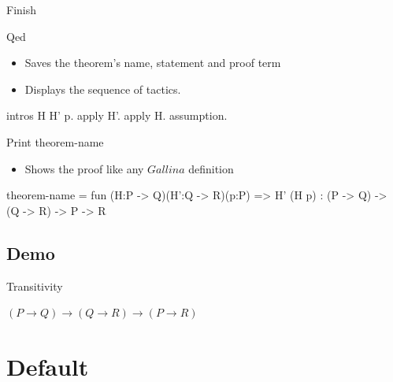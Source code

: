 \begin{frame}[fragile]{Finish}
	\begin{user}
	Qed
	\end{user}
	\pause
	\begin{itemize}
		\item Saves the theorem's name, statement and proof term
		\pause
		\item Displays the sequence of tactics.
	\end{itemize}
	\begin{coq}
	intros H H' p.
	apply H'.
	apply H.
	assumption.
	\end{coq}
	\pause
	\medskip
	\begin{user}
	Print theorem-name
	\end{user}
	\pause
	\begin{itemize}
		\item Shows the proof like any $Gallina$ definition
	\end{itemize}
	\begin{coq}
	theorem-name = fun (H:P -> Q)(H':Q -> R)(p:P) => H' (H p)
		 : (P -> Q) -> (Q -> R) -> P -> R
	\end{coq}
\end{frame}

\subsection{Demo}
\begin{frame}{Transitivity}
	\begin{center}
		$(P \rightarrow Q) \rightarrow (Q \rightarrow R) \rightarrow (P \rightarrow R)$
	\end{center}
\end{frame}



\section{Default}

